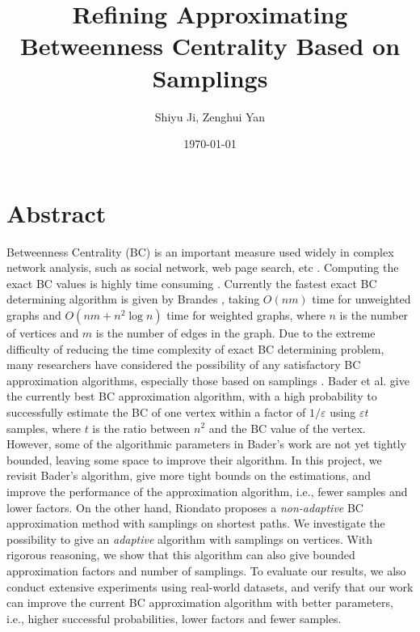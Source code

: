 \documentclass[10pt]{article}
\begin{document}
\title{Refining Approximating Betweenness Centrality Based on Samplings}
\author{Shiyu Ji, Zenghui Yan}
\date{\today}
\maketitle

\newtheorem{definition}{Definition}
\newtheorem{theorem}{Theorem}
\newtheorem{lemma}{Lemma}
\newtheorem{corollary}{Corollary}

\newcommand{\p}{\mathrm{Pr}}

\section{Abstract}
Betweenness Centrality (BC) is an important measure used widely in complex network analysis, such as social network, web page search, etc \cite{barthelemy2004betweenness}. Computing the exact BC values is highly time consuming \cite{brandes2001faster, brandes2008variants}. Currently the fastest exact BC determining algorithm is given by Brandes \cite{brandes2001faster}, taking $O(nm)$ time for unweighted graphs and $O(nm+n^2\log n)$ time for weighted graphs, where $n$ is the number of vertices and $m$ is the number of edges in the graph. Due to the extreme difficulty of reducing the time complexity of exact BC determining problem, many researchers have considered the possibility of any satisfactory BC approximation algorithms, especially those based on samplings \cite{bader2007approximating, geisberger2008better}. Bader et al. \cite{bader2007approximating} give the currently best BC approximation algorithm, with a high probability to successfully estimate the BC of one vertex within a factor of $1/\varepsilon$ using $\varepsilon t$ samples, where $t$ is the ratio between $n^2$ and the BC value of the vertex. However, some of the algorithmic parameters in Bader's work are not yet tightly bounded, leaving some space to improve their algorithm. In this project, we revisit Bader's algorithm, give more tight bounds on the estimations, and improve the performance of the approximation algorithm, i.e., fewer samples and lower factors. On the other hand, Riondato \cite{riondato2014fast} proposes a \emph{non-adaptive} BC approximation method with samplings on shortest paths. We investigate the possibility to give an \emph{adaptive} algorithm with samplings on vertices. With rigorous reasoning, we show that this algorithm can also give bounded approximation factors and number of samplings. To evaluate our results, we also conduct extensive experiments using real-world datasets, and verify that our work can improve the current BC approximation algorithm with better parameters, i.e., higher successful probabilities, lower factors and fewer samples.
\end{document}
